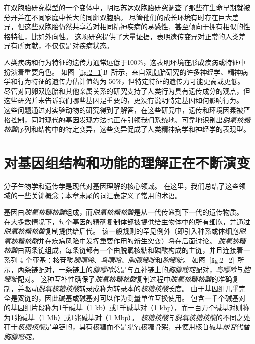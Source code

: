 在双胞胎研究模型的一个变体中，明尼苏达双胞胎研究调查了那些在生命早期就被分开并在不同家庭中长大的同卵双胞胎。
尽管他们的成长环境有时存在巨大差异，但这些双胞胎仍然共享着对相同精神疾病的易感性，甚至倾向于拥有相似的性格特征，比如外向性。
这项研究提供了大量证据，表明遗传变异对正常的人类差异有所贡献，不仅仅是对疾病状态。





人类疾病和行为特征的遗传力通常远低于100\%，这表明环境在形成疾病或特征中扮演着重要角色。
如图~\ref{fig:2_1}B~所示，来自双胞胎研究的许多神经学、精神病学和行为特征的遗传力估计值约为 50\%，但特定特征的遗传力可能更高或更低。
尽管对同卵双胞胎和其他亲属关系的研究支持了人类行为具有遗传成分的观点，但这些研究并未告诉我们哪些基因是重要的，更没有说明特定基因如何影响行为。
这些问题通过对实验动物的研究得到了解答，在这些研究中，遗传和环境因素被严格控制，同时现代的基因发现方法也正在引领我们系统地、可靠地识别出\textit{脱氧核糖核酸}序列和结构中的特定变异，这些变异促成了人类精神病学和神经学的表现型。



\section{对基因组结构和功能的理解正在不断演变}

分子生物学和遗传学是现代对基因理解的核心领域。
在这里，我们总结了这些领域的一些关键概念；本章末尾的词汇表定义了常用的术语。




基因由\textit{脱氧核糖核酸}组成，而\textit{脱氧核糖核酸}是从一代传递到下一代的遗传物质。
在大多数情况下，每个基因的精确复制体都被提供给生物体中的所有细胞，并通过\textit{脱氧核糖核酸}复制提供给后代。
该一般规则的罕见例外（即引入种系或体细胞\textit{脱氧核糖核酸}并在疾病风险中发挥重要作用的新生突变）将在后面讨论。
\textit{脱氧核糖核酸}由两条链组成，每条链都有一个由脱氧核糖和磷酸构成的主链，并且连接着一系列 4 个亚基：核苷酸\textit{腺嘌呤}、\textit{鸟嘌呤}、\textit{胸腺嘧啶}和\textit{胞嘧啶}。
如图~\ref{fig:2_2}~所示，两条链配对，一条链上的\textit{腺嘌呤}总是与互补链上的\textit{胸腺嘧啶}配对，\textit{鸟嘌呤}与\textit{胞嘧啶}配对。
这种互补性确保了\textit{脱氧核糖核酸}复制过程中\textit{脱氧核糖核酸}的准确复制，并驱动\textit{脱氧核糖核酸}转录成称为转录本的\textit{核糖核酸}长度。
由于基因组几乎完全是双链的，因此碱基或碱基对可以作为测量单位互换使用。
包含一千个碱基对的基因组片段称为1千碱基（1 kb）或1千碱基对（1 kbp），而一百万个碱基对则称为1兆碱基（1 Mb）或1兆碱基对（1 Mbp）。
\textit{核糖核酸}与\textit{脱氧核糖核酸}的不同之处在于\textit{核糖核酸}是单链的，具有核糖而不是脱氧核糖骨架，并使用核苷碱基\textit{尿苷}代替\textit{胸腺嘧啶}。


